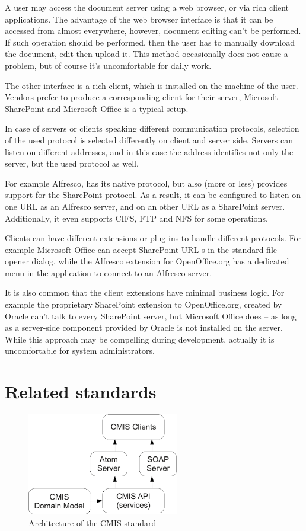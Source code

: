 A user may access the document server using a web browser, or via rich client
applications. The advantage of the web browser interface is that it can be
accessed from almost everywhere, however, document editing can't be performed.
If such operation should be performed, then the user has to manually download
the document, edit then upload it. This method occasionally does not cause a
problem, but of course it's uncomfortable for daily work.

The other interface is a rich client, which is installed on the machine of the
user. Vendors prefer to produce a corresponding client for their server,
Microsoft SharePoint and Microsoft Office is a typical setup.

In case of servers or clients speaking different communication protocols,
selection of the used protocol is selected differently on client and server
side. Servers can listen on different addresses, and in this case the address
identifies not only the server, but the used protocol as well.

For example Alfresco, has its native protocol, but also (more or less) provides
support for the SharePoint protocol. As a result, it can be configured to
listen on one URL as an Alfresco server, and on an other URL as a SharePoint
server. Additionally, it even supports CIFS, FTP and NFS for some
operations.\cite{alfresco-fsc}

Clients can have different extensions or plug-ins to handle different
protocols. For example Microsoft Office can accept SharePoint URL-s in the
standard file opener dialog, while the Alfresco extension for OpenOffice.org
has a dedicated menu in the application to connect to an Alfresco server.

It is also common that the client extensions have minimal business logic. For
example the proprietary SharePoint extension to OpenOffice.org, created by
Oracle can't talk to every SharePoint server, but Microsoft Office does -- as
long as a server-side component provided by Oracle is not installed on the
server. While this approach may be compelling during development, actually it
is uncomfortable for system administrators.

\section{Related standards}

\begin{figure}[H]
\centering
\includegraphics[width=250px,keepaspectratio]{cmis.pdf}
\caption{Architecture of the CMIS standard}
\label{fig:cmis}
\end{figure}

